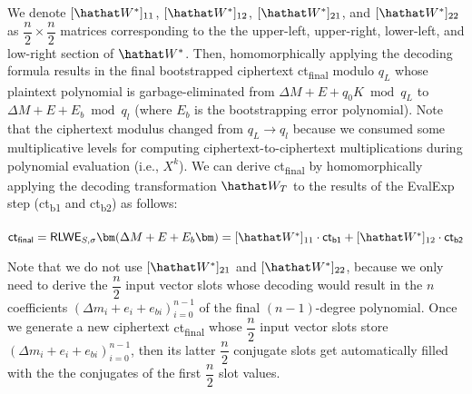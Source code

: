 $ $

$ $

We denote $[\hathat W^*]_{11}$, $[\hathat W^*]_{12}$, $[\hathat W^*]_{21}$, and $[\hathat W^*]_{22}$ as $\dfrac{n}{2} \times \dfrac{n}{2}$ matrices corresponding to the the upper-left, upper-right, lower-left, and low-right section of $\hathat W^*$. Then, homomorphically applying the decoding formula results in the final bootstrapped ciphertext \textsf{ct\textsubscript{final}} modulo $q_L$ whose plaintext polynomial is garbage-eliminated from $\Delta M + E + q_0K \bmod q_L$ to $\Delta M + E + E_b \bmod q_l$ (where $E_b$ is the bootstrapping error polynomial). Note that the ciphertext modulus changed from $q_L \rightarrow q_l$ because we consumed some multiplicative levels for computing ciphertext-to-ciphertext multiplications during polynomial evaluation (i.e., $X^k$).  We can derive  \textsf{ct\textsubscript{final}} by homomorphically applying the decoding transformation $\hathat W_T$ to the results of the \textsf{EvalExp} step (\textsf{ct\textsubscript{b1}} and \textsf{ct\textsubscript{b2}}) as follows:

$\textsf{ct\textsubscript{final}} = \textsf{RLWE}_{S, \sigma}\bm(\Delta M + E + E_{b}\bm) = [\hathat W^*]_{11} \cdot \textsf{ct\textsubscript{b1}} + [\hathat W^*]_{12} \cdot \textsf{ct\textsubscript{b2}}$

Note that we do not use $[\hathat W^*]_{21}$ and $[\hathat W^*]_{22}$, because we only need to derive the $\dfrac{n}{2}$ input vector slots whose decoding would result in the $n$ coefficients $(\Delta m_i + e_i + e_{bi})_{i=0}^{n-1}$ of the final $(n-1)$-degree polynomial. Once we generate a new ciphertext \textsf{ct\textsubscript{final}} whose $\dfrac{n}{2}$ input vector slots store $(\Delta m_i + e_i + e_{bi})_{i=0}^{n-1}$, then its latter $\dfrac{n}{2}$ conjugate slots get automatically filled with the the conjugates of the first $\dfrac{n}{2}$ slot values.

